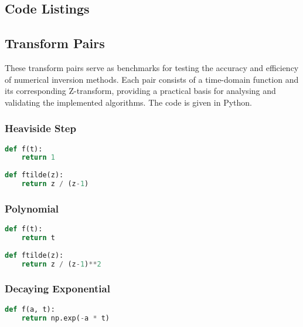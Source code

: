 \begin{appendices}

%

\chapter{Code Listings}\label{chapter:code_listings}

\section{Transform Pairs}
These transform pairs serve as benchmarks for testing the accuracy and efficiency of numerical inversion methods. Each pair consists of a time-domain function and its corresponding Z-transform, providing a practical basis for analysing and validating the implemented algorithms. The code is given in Python.

\subsection{Heaviside Step}
\begin{lstlisting}[language=Python, caption= Implementation of the Heaviside Step function and its $\mathcal{Z}$-transform (Section \ref{section:heaviside_step})]
def f(t):
    return 1
    
def ftilde(z):
    return z / (z-1)
\end{lstlisting}

\subsection{Polynomial}
\begin{lstlisting}[language=Python, caption= Implementation of the Polynomial function and its $\mathcal{Z}$-transform (Section \ref{section:polynomial})]
def f(t):
    return t
    
def ftilde(z):
    return z / (z-1)**2
\end{lstlisting}

\subsection{Decaying Exponential}
\begin{lstlisting}[language=Python, caption= Implementation of the Decaying Exp function and its $\mathcal{Z}$-transform (Section \ref{section:decaying_exp})]
def f(a, t):
    return np.exp(-a * t)
    

\end{lstlisting}
\end{appendices}
